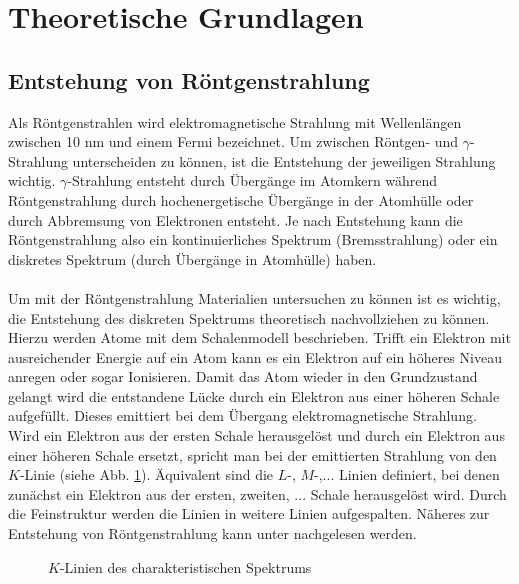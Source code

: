 \section{Theoretische Grundlagen}
\subsection{Entstehung von Röntgenstrahlung}
Als Röntgenstrahlen wird elektromagnetische Strahlung mit Wellenlängen zwischen 10 nm und einem Fermi bezeichnet. Um zwischen Röntgen- und $\gamma$-Strahlung unterscheiden zu können, ist die Entstehung der jeweiligen Strahlung wichtig. $\gamma$-Strahlung entsteht durch Übergänge im Atomkern während Röntgenstrahlung durch hochenergetische Übergänge in der Atomhülle oder durch Abbremsung von Elektronen entsteht. Je nach Entstehung kann die Röntgenstrahlung also ein kontinuierliches Spektrum (Bremsstrahlung) oder ein diskretes Spektrum (durch Übergänge in Atomhülle) haben.\\ \\
Um mit der Röntgenstrahlung Materialien untersuchen zu können ist es wichtig, die Entstehung des diskreten Spektrums theoretisch nachvollziehen zu können. Hierzu werden Atome mit dem Schalenmodell beschrieben. Trifft ein Elektron mit ausreichender Energie auf ein Atom kann es ein Elektron auf ein höheres Niveau anregen oder sogar Ionisieren. Damit das Atom wieder in den Grundzustand gelangt wird die entstandene Lücke durch ein Elektron aus einer höheren Schale aufgefüllt. Dieses emittiert bei dem Übergang elektromagnetische Strahlung. Wird ein Elektron aus der ersten Schale herausgelöst und durch ein Elektron aus einer höheren Schale ersetzt, spricht man bei der emittierten Strahlung von den $K$-Linie (siehe Abb. \ref{fig:k_linien}). Äquivalent sind die $L$-, $M$-,... Linien definiert, bei denen zunächst ein Elektron aus der ersten, zweiten, ... Schale herausgelöst wird. Durch die Feinstruktur werden die Linien in weitere Linien aufgespalten. Näheres zur Entstehung von Röntgenstrahlung kann unter \cite{grundlagen} nachgelesen werden.
\begin{figure}[h]
  \centering
  \caption{$K$-Linien des charakteristischen Spektrums}
  \label{fig:k_linien}
\end{figure}

